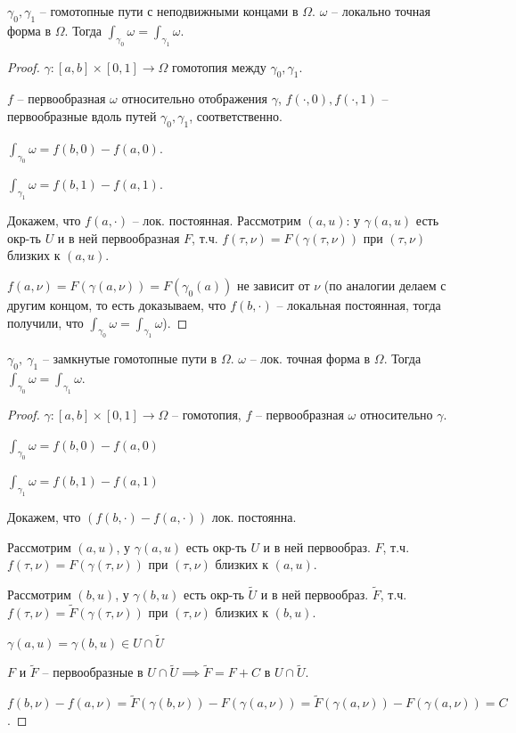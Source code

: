 \begin{theorem}
    $\gamma_0, \gamma_1$ -- гомотопные пути с неподвижными концами в $\Omega$. $\omega$ -- локально точная форма в $\Omega$. Тогда $\int_{\gamma_0} {\omega} = \int_{\gamma_1} {\omega}$.
\end{theorem}
\begin{proof}
    $\gamma: [a, b] \times [0, 1] \rightarrow \Omega$ гомотопия между $\gamma_0, \gamma_1$.
    
    $f$ -- первообразная $\omega$ относительно отображения $\gamma$, $f(\cdot, 0), f(\cdot, 1)$ -- первообразные вдоль путей $\gamma_0, \gamma_1$, соответственно.

    $\int_{\gamma_0} {\omega} = f(b, 0) - f(a, 0)$.

    $\int_{\gamma_1} {\omega} = f(b, 1) - f(a, 1)$.
    
    Докажем, что $f(a, \cdot)$ -- лок. постоянная. Рассмотрим $(a, u)$: у $\gamma(a, u)$ есть окр-ть $U$ и в ней первообразная $F$, т.ч. $f(\tau, \nu) = F(\gamma(\tau, \nu))$ при $(\tau, \nu)$ близких к $(a, u)$.

    $f(a, \nu) = F(\gamma(a, \nu)) = F(\gamma_0(a))$ не зависит от $\nu$ (по аналогии делаем с другим концом, то есть доказываем, что $f(b, \cdot)$ -- локальная постоянная, тогда получили, что $\int_{\gamma_0} {\omega} = \int_{\gamma_1} {\omega}$).
\end{proof}

\begin{theorem}
    $\gamma_0, \ \gamma_1$ -- замкнутые гомотопные пути в $\Omega$. $\omega$ -- лок. точная форма в $\Omega$. Тогда $\int_{\gamma_0} { \omega } = \int_{\gamma_1} { \omega }$.
\end{theorem}
\begin{proof}
    $\gamma: [a, b] \times [0, 1] \rightarrow \Omega$ -- гомотопия, $f$ -- первообразная $\omega$ относительно $\gamma$.

    $\int_{\gamma_0} { \omega } = f(b, 0) - f(a, 0)$
    
    $\int_{\gamma_1} { \omega } = f(b, 1) - f(a, 1)$

    Докажем, что $\left(f(b, \cdot) - f(a, \cdot)\right)$ лок. постоянна.
    
    Рассмотрим $(a, u)$, у $\gamma(a, u)$ есть окр-ть $U$ и в ней первообраз. $F$, т.ч. $f(\tau, \nu) = F(\gamma(\tau, \nu))$ при $(\tau, \nu)$ близких к $(a, u)$.

    Рассмотрим $(b, u)$, у $\gamma(b, u)$ есть окр-ть $\tilde{U}$ и в ней первообраз. $\tilde{F}$, т.ч. $f(\tau, \nu) = \tilde{F}(\gamma(\tau, \nu))$ при $(\tau, \nu)$ близких к $(b, u)$.

    $\gamma(a, u) = \gamma(b, u) \in U \cap \tilde{U}$

    $F$ и $\tilde{F}$ -- первообразные в $U \cap \tilde{U} \implies \tilde{F} = F + C$ в $U \cap \tilde{U}$.

    $f(b, \nu) - f(a, \nu) = \tilde{F}(\gamma(b, \nu)) - F(\gamma(a, \nu)) = \tilde{F}(\gamma(a, \nu)) - F(\gamma(a, \nu)) = C$.
\end{proof}

